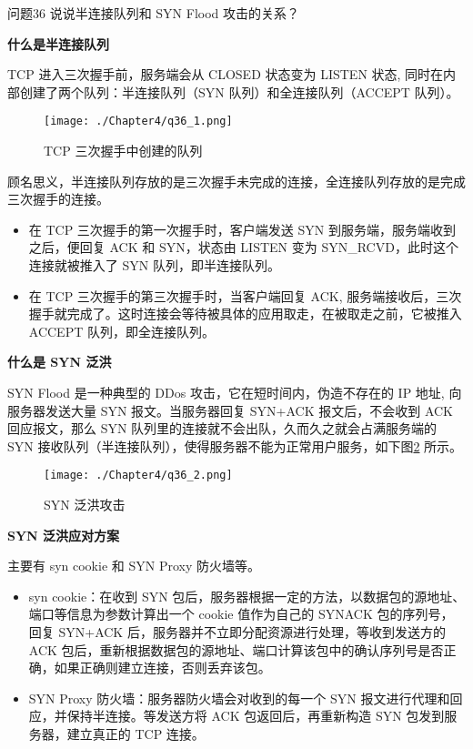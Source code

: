 \documentclass[cn,11pt,color=blue,lang=cn]{elegantbook}
\begin{document}
\begin{custom}{问题36}
说说半连接队列和 SYN Flood 攻击的关系？
\end{custom}
\begin{solution}
\begin{note} \textbf{什么是半连接队列} \end{note}
TCP 进入三次握手前，服务端会从 CLOSED 状态变为 LISTEN 状态, 同时在内部创建了两个队列：半连接队列（SYN 队列）和全连接队列（ACCEPT 队列）。
\begin{figure}[htbp]
\centering
\texttt{[image: ./Chapter4/q36\_1.png]}
\caption{TCP 三次握手中创建的队列}
\label{fig36_1}
\end{figure}


顾名思义，半连接队列存放的是三次握手未完成的连接，全连接队列存放的是完成三次握手的连接。
\begin{itemize}
	\item 在 TCP 三次握手的第一次握手时，客户端发送 SYN 到服务端，服务端收到之后，便回复 ACK 和 SYN，状态由 LISTEN 变为 SYN\_RCVD，此时这个连接就被推入了 SYN 队列，即半连接队列。
	\item 在 TCP 三次握手的第三次握手时，当客户端回复 ACK, 服务端接收后，三次握手就完成了。这时连接会等待被具体的应用取走，在被取走之前，它被推入 ACCEPT 队列，即全连接队列。
\end{itemize}
\begin{note} \textbf{什么是 SYN 泛洪} \end{note}

SYN Flood 是一种典型的 DDos 攻击，它在短时间内，伪造不存在的 IP 地址, 向服务器发送大量 SYN 报文。当服务器回复 SYN+ACK 报文后，不会收到 ACK 回应报文，那么 SYN 队列里的连接就不会出队，久而久之就会占满服务端的 SYN 接收队列（半连接队列），使得服务器不能为正常用户服务，如下图\ref{fig36_2} 所示。
\begin{figure}[htbp]
\centering
\texttt{[image: ./Chapter4/q36\_2.png]}
\caption{SYN 泛洪攻击}
\label{fig36_2}
\end{figure}


\begin{note} \textbf{SYN 泛洪应对方案} \end{note}
主要有 syn cookie 和 SYN Proxy 防火墙等。
\begin{itemize}
	\item syn cookie：在收到 SYN 包后，服务器根据一定的方法，以数据包的源地址、端口等信息为参数计算出一个 cookie 值作为自己的 SYNACK 包的序列号，回复 SYN+ACK 后，服务器并不立即分配资源进行处理，等收到发送方的 ACK 包后，重新根据数据包的源地址、端口计算该包中的确认序列号是否正确，如果正确则建立连接，否则丢弃该包。
	\item SYN Proxy 防火墙：服务器防火墙会对收到的每一个 SYN 报文进行代理和回应，并保持半连接。等发送方将 ACK 包返回后，再重新构造 SYN 包发到服务器，建立真正的 TCP 连接。
\end{itemize}
\end{solution}
\end{document}

